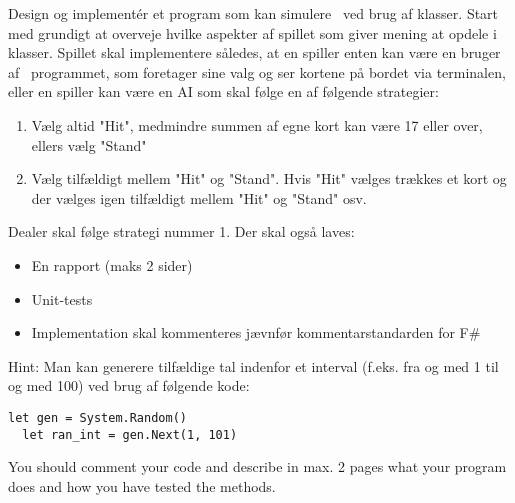 Design og implement\'{e}r et program som kan simulere \sbl\ ved brug af klasser.  Start med grundigt at overveje hvilke aspekter af spillet som giver mening at opdele i klasser. Spillet skal implementere således, at en spiller enten kan være en bruger af \sbl\ programmet, som foretager sine valg og ser kortene på bordet via terminalen, eller en spiller kan være en AI som skal følge en af følgende strategier:
\begin{enumerate}
\item Vælg altid "Hit", medmindre summen af egne kort kan være 17 eller over, ellers vælg "Stand"
\item Vælg tilfældigt mellem "Hit" og "Stand". Hvis "Hit" vælges trækkes et kort og der vælges igen tilfældigt mellem "Hit" og "Stand" osv.
\end{enumerate}
Dealer skal følge strategi nummer 1.  Der skal også laves:
\begin{itemize}
\item En rapport (maks 2 sider)
\item Unit-tests
\item Implementation skal kommenteres jævnfør kommentarstandarden for F\#
\end{itemize}
Hint: Man kan generere tilfældige tal indenfor et interval (f.eks. fra og med 1 til og med 100) ved brug af følgende kode:
\begin{lstlisting}[frame=none]
  let gen = System.Random()
  let ran_int = gen.Next(1, 101)
\end{lstlisting}

You should comment your code and describe in max. 2 pages what your program does and how you have tested the methods.
